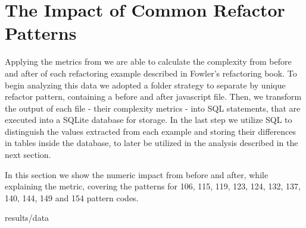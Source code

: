 \section{The Impact of Common Refactor Patterns}

Applying the metrics from \cite{article:mozilla} we are able to calculate the complexity from before and after of each
refactoring example described in Fowler's refactoring book. To begin analyzing this data we adopted a folder strategy to
separate by unique refactor pattern, containing a before and after javascript file. Then, we transform the output of
each file - their complexity metrics - into SQL statements, that are executed into a SQLite database for storage. In the
last step we utilize SQL to distinguish the values extracted from each example and storing their differences in tables
inside the database, to later be utilized in the analysis described in the next section.


In this section we show the numeric impact from before and after, while explaining the metric, covering the patterns for
106, 115, 119, 123, 124, 132, 137, 140, 144, 149 and 154 pattern codes.

{results/data}
